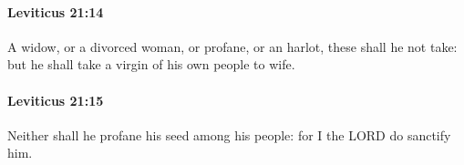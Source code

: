 		\paragraph{Leviticus 21:14} %
			\label{LEVITICUS-21-14}

			A widow, or a divorced woman, or profane, or an harlot, these shall he not take: but he shall take a virgin of his own people to wife.


		\paragraph{Leviticus 21:15} %
			\label{LEVITICUS-21-15}

			Neither shall he profane his seed among his people: for I the LORD do sanctify him.


